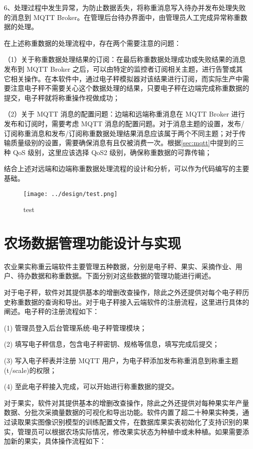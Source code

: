 6、处理过程中发生异常，为防止数据丢失，将称重消息写入待办并发布处理失败的消息到 MQTT Broker。在管理后台待办界面中，由管理员人工完成异常称重数据的处理。

在上述称重数据的处理流程中，存在两个需要注意的问题：

（1）关于称重数据处理结果的订阅：在最后称重数据处理成功或失败结果的消息发布到 MQTT Broker 之后，可以由特定的监控者订阅相关主题，进行告警或其它相关操作。在本软件中，通过电子秤模拟器对该结果进行订阅，而实际生产中需要注意电子秤不需要关心这个数据处理的结果，只要电子秤在边端完成称重数据的提交，电子秤就将称重操作视做成功；

（2）关于 MQTT 消息的配置问题：边端和远端称重消息在 MQTT Broker 进行发布和订阅时，需要考虑 MQTT 消息的配置问题。对于消息主题的设置，发布/订阅称重消息和发布/订阅称重数据处理结果消息应该属于两个不同主题；对于传输质量级别的设置，需要确保消息有且仅被消费一次。根据\ref{sec:mqtt}中提到的三种 QoS 级别，这里应该选择 QoS2 级别，确保称重数据的可靠传输；

结合上述对远端和边端称重数据处理流程的设计和分析，可以作为代码编写的主要基础。

\begin{figure}[H]
    \centering
    \texttt{[image: ../design/test.png]}
    \caption{test}
    \label{fig:test}
\end{figure}

\section{农场数据管理功能设计与实现}\label{data-management}

农业果实称重云端软件主要管理五种数据，分别是电子秤、果实、采摘作业、用户、待办数据和称重数据。下面分别对这些数据的管理功能进行阐述。

对于电子秤，软件对其提供基本的增删改查操作，除此之外还提供对每个电子秤历史称重数据的查询和导出。对于电子秤接入云端软件的注册流程，这里进行具体的阐述。电子秤的注册流程如下：

(1) 管理员登入后台管理系统-电子秤管理模块；

(2) 填写电子秤信息，包含电子秤密钥、规格等信息，填写完成后提交；

(3) 写入电子秤表并注册 MQTT 用户，为电子秤添加发布称重消息到称重主题(t/scale)的权限；

(4) 至此电子秤接入完成，可以开始进行称重数据的提交。

对于果实，软件对其提供基本的增删改查操作，除此之外还提供对每种果实年产量数据、分批次采摘量数据的可视化和导出功能。软件内置了超二十种果实种类，通过读取果实图像识别模型的训练配置文件，在数据库果实表初始化了支持识别的果实，管理员可以根据农场实际情况，修改果实状态为种植中或未种植。如果需要添加新的果实，具体操作流程如下：

